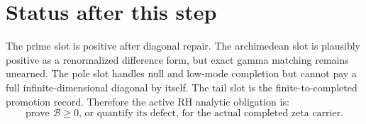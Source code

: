 \documentclass[11pt]{article}
\begin{document}
\section{Status after this step}
The prime slot is positive after diagonal repair.  The archimedean slot is plausibly positive as a renormalized difference form, but exact gamma matching remains unearned.  The pole slot handles null and low-mode completion but cannot pay a full infinite-dimensional diagonal by itself.  The tail slot is the finite-to-completed promotion record.  Therefore the active RH analytic obligation is:
\[
  \boxed{\text{prove }\mathcal B\ge0\text{, or quantify its defect, for the actual completed zeta carrier}.}
\]
\end{document}

